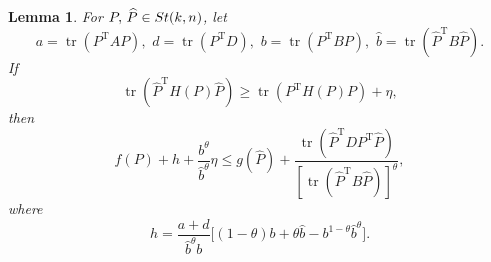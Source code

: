 \documentclass[10pt,a4paper]{amsart}
\def\newgamma{h}
\def\newbeta{b}
\def\newdelta{d}
\def\newalpha{a}
\newtheorem{lemma}{Lemma}
\newcommand\STM[2]{{\rm St}(#1,#2)}
\DeclareMathOperator{\T}{T}
\DeclareMathOperator{\tr}{tr}
\def\what{\widehat}
\begin{document}
\begin{lemma}\label{lm:mono:wazl2022}
For $P,\,\what P\in\STM{k}{n}$, let
\begin{equation}\nonumber %
\newalpha=\tr ( P^{\T}AP),\,\,
\newdelta=\tr ( P^{\T}D),\,\,
\newbeta=\tr ( P^{\T} B P),\,\,
\hat\newbeta=\tr (\what P^{\T} B\what P).
\end{equation}
If
\begin{equation}\label{eq:tr-ineq}
\tr(\what P^{\T} H(P)\what P)\ge\tr ( P^{\T} H(P) P)+\eta,
\end{equation}
then
\begin{equation}\label{eq:obj-ineq-detail}
f(P)+\newgamma+\frac {\newbeta^{\theta}}{\hat\newbeta^{\theta}}\eta\le g(\what P)
             +\frac {\tr(\what P^{\T} DP^{\T}\what P)}{[\tr(\what P^{\T} B\what P)]^{\theta}},
\end{equation}
where
\begin{equation}\label{eq:gamma}
\newgamma=\frac {\newalpha+\newdelta}{\hat\newbeta^{\theta}\newbeta}
     \Big[(1-\theta)\newbeta+\theta\hat\newbeta-\newbeta^{1-\theta}\hat\newbeta^{\theta}\Big].
\end{equation}
\end{lemma}
\end{document}
